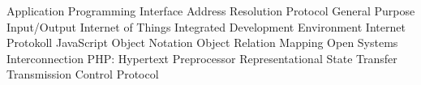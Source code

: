 \begin{acronym}[Bash]
  {Application Programming Interface}
  {Address Resolution Protocol}
  {General Purpose Input/Output}
  {Internet of Things}
  {Integrated Development Environment}
  {Internet Protokoll}
  {JavaScript Object Notation}
  {Object Relation Mapping}
  {Open Systems Interconnection}
  {PHP: Hypertext Preprocessor}
  {Representational State Transfer}
  {Transmission Control Protocol}
 \end{acronym}
